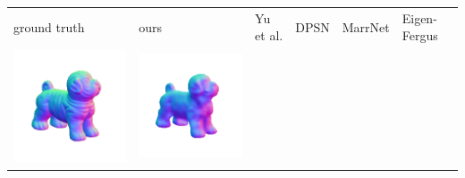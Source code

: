 \begin{center}
\begin{tabularx}{\linewidth}{@{}Y@{}Y@{}Y@{}Y@{}Y@{}Y@{}}
ground truth & ours & Yu et al. & DPSN & MarrNet & Eigen-Fergus \\
\includegraphics[width=\linewidth]{semisynthetic/20160617_17_gt.png} &
\includegraphics[width=\linewidth]{semisynthetic/20160617_17_ours_out.png} &

\end{tabularx}
\end{center}
